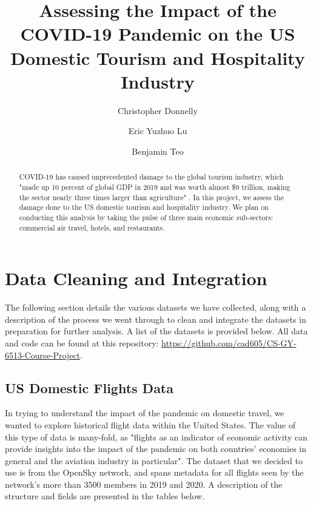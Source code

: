 \documentclass[sigconf, nonacm]{acmart}
\begin{document}
\title{Assessing the Impact of the COVID-19 Pandemic on the US Domestic Tourism and Hospitality Industry}
\author{Christopher Donnelly}

\author{Eric Yuzhuo Lu}

\author{Benjamin Teo}

\renewcommand{\shortauthors}{Group 9}

\begin{abstract}
COVID-19 has caused unprecedented damage to the global tourism industry, which "made up 10 percent of global GDP in 2019 and was worth almost \$9 trillion, making the sector nearly three times larger than agriculture" \cite{McKinsey0820}. In this project, we assess the damage done to the US domestic tourism and hospitality industry. We plan on conducting this analysis by taking the pulse of three main economic sub-sectors: commercial air travel, hotels, and restaurants.
\end{abstract}

\maketitle

\section{Data Cleaning and Integration}
The following section details the various datasets we have collected, along with a description of the process we went through to clean and integrate the datasets in preparation for further analysis. A list of the datasets is provided below. All data and code can be found at this repository: \url{https://github.com/cad605/CS-GY-6513-Course-Project}.

\subsection{US Domestic Flights Data}

In trying to understand the impact of the pandemic on domestic travel, we wanted to explore historical flight data within the United States. The value of this type of data is many-fold, as "flights as an indicator of economic activity can provide insights into the impact of the pandemic on both countries' economies in general and the aviation industry in particular"\cite{OpenSky1220}. The dataset that we decided to use is from the OpenSky network, and spans metadata for all flights seen by the network's more than 3500 members in 2019 and 2020. A description of the structure and fields are presented in the tables below.
\end{document}
